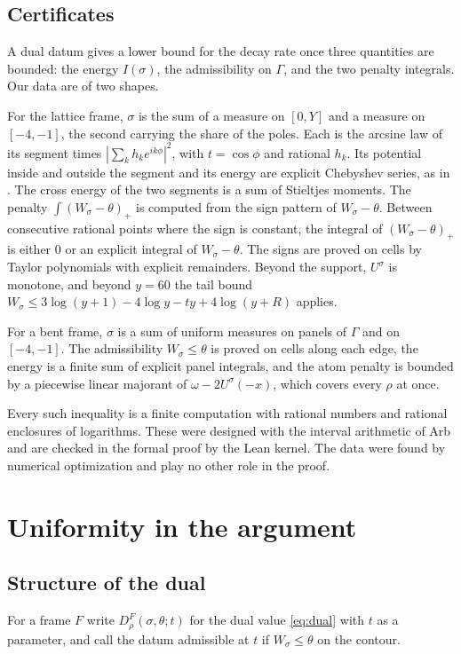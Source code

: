 \documentclass[11pt]{amsart}
\theoremstyle{definition}
\theoremstyle{remark}
\numberwithin{equation}{section}
\begin{document}
\subsection{Certificates}\label{ssec:cert}
A dual datum gives a lower bound for the decay rate once three quantities are bounded: the energy $I(\sigma)$, the
admissibility on $\Gamma$, and the two penalty integrals. Our data are of two shapes.

For the lattice frame, $\sigma$ is the sum of a measure on $[0,Y]$ and a measure on $[-4,-1]$, the second carrying the
share of the poles. Each is the arcsine law of its segment times $|\sum_kh_ke^{ik\phi}|^2$, with $t=\cos\phi$ and
rational $h_k$. Its potential inside and outside the segment and its energy are explicit Chebyshev series, as in
\cite{Litsey2026c}. The cross energy of the two segments is a sum of Stieltjes moments. The penalty
$\int(W_\sigma-\theta)_+$ is computed from the sign pattern of $W_\sigma-\theta$. Between consecutive rational points
where the sign is constant, the integral of $(W_\sigma-\theta)_+$ is either $0$ or an explicit integral of
$W_\sigma-\theta$. The signs are proved on cells by Taylor polynomials with explicit remainders. Beyond the support,
$U^\sigma$ is monotone, and beyond $y=60$ the tail bound $W_\sigma\le3\log(y+1)-4\log y-ty+4\log(y+R)$ applies.

For a bent frame, $\sigma$ is a sum of uniform measures on panels of $\Gamma$ and on $[-4,-1]$. The admissibility
$W_\sigma\le\theta$ is proved on cells along each edge, the energy is a finite sum of explicit panel integrals, and the
atom penalty is bounded by a piecewise linear majorant of $\omega-2U^\sigma(-x)$, which covers every $\rho$ at once.

Every such inequality is a finite computation with rational numbers and rational enclosures of logarithms. These were
designed with the interval arithmetic of Arb \cite{Arb} and are checked in the formal proof by the Lean kernel. The
data were found by numerical optimization and play no other role in the proof.

\section{Uniformity in the argument}\label{sec:uniform}

\subsection{Structure of the dual}
For a frame $F$ write $D^F_\rho(\sigma,\theta;t)$ for the dual value \eqref{eq:dual} with $t$ as a parameter, and call
the datum admissible at $t$ if $W_\sigma\le\theta$ on the contour.
\end{document}
